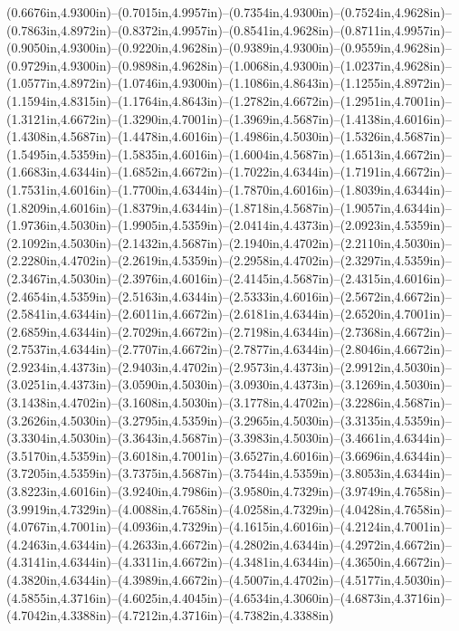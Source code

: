(0.6676in,4.9300in)--(0.7015in,4.9957in)--(0.7354in,4.9300in)--(0.7524in,4.9628in)--(0.7863in,4.8972in)--(0.8372in,4.9957in)--(0.8541in,4.9628in)--(0.8711in,4.9957in)--(0.9050in,4.9300in)--(0.9220in,4.9628in)--(0.9389in,4.9300in)--(0.9559in,4.9628in)--(0.9729in,4.9300in)--(0.9898in,4.9628in)--(1.0068in,4.9300in)--(1.0237in,4.9628in)--(1.0577in,4.8972in)--(1.0746in,4.9300in)--(1.1086in,4.8643in)--(1.1255in,4.8972in)--(1.1594in,4.8315in)--(1.1764in,4.8643in)--(1.2782in,4.6672in)--(1.2951in,4.7001in)--(1.3121in,4.6672in)--(1.3290in,4.7001in)--(1.3969in,4.5687in)--(1.4138in,4.6016in)--(1.4308in,4.5687in)--(1.4478in,4.6016in)--(1.4986in,4.5030in)--(1.5326in,4.5687in)--(1.5495in,4.5359in)--(1.5835in,4.6016in)--(1.6004in,4.5687in)--(1.6513in,4.6672in)--(1.6683in,4.6344in)--(1.6852in,4.6672in)--(1.7022in,4.6344in)--(1.7191in,4.6672in)--(1.7531in,4.6016in)--(1.7700in,4.6344in)--(1.7870in,4.6016in)--(1.8039in,4.6344in)--(1.8209in,4.6016in)--(1.8379in,4.6344in)--(1.8718in,4.5687in)--(1.9057in,4.6344in)--(1.9736in,4.5030in)--(1.9905in,4.5359in)--(2.0414in,4.4373in)--(2.0923in,4.5359in)--(2.1092in,4.5030in)--(2.1432in,4.5687in)--(2.1940in,4.4702in)--(2.2110in,4.5030in)--(2.2280in,4.4702in)--(2.2619in,4.5359in)--(2.2958in,4.4702in)--(2.3297in,4.5359in)--(2.3467in,4.5030in)--(2.3976in,4.6016in)--(2.4145in,4.5687in)--(2.4315in,4.6016in)--(2.4654in,4.5359in)--(2.5163in,4.6344in)--(2.5333in,4.6016in)--(2.5672in,4.6672in)--(2.5841in,4.6344in)--(2.6011in,4.6672in)--(2.6181in,4.6344in)--(2.6520in,4.7001in)--(2.6859in,4.6344in)--(2.7029in,4.6672in)--(2.7198in,4.6344in)--(2.7368in,4.6672in)--(2.7537in,4.6344in)--(2.7707in,4.6672in)--(2.7877in,4.6344in)--(2.8046in,4.6672in)--(2.9234in,4.4373in)--(2.9403in,4.4702in)--(2.9573in,4.4373in)--(2.9912in,4.5030in)--(3.0251in,4.4373in)--(3.0590in,4.5030in)--(3.0930in,4.4373in)--(3.1269in,4.5030in)--(3.1438in,4.4702in)--(3.1608in,4.5030in)--(3.1778in,4.4702in)--(3.2286in,4.5687in)--(3.2626in,4.5030in)--(3.2795in,4.5359in)--(3.2965in,4.5030in)--(3.3135in,4.5359in)--(3.3304in,4.5030in)--(3.3643in,4.5687in)--(3.3983in,4.5030in)--(3.4661in,4.6344in)--(3.5170in,4.5359in)--(3.6018in,4.7001in)--(3.6527in,4.6016in)--(3.6696in,4.6344in)--(3.7205in,4.5359in)--(3.7375in,4.5687in)--(3.7544in,4.5359in)--(3.8053in,4.6344in)--(3.8223in,4.6016in)--(3.9240in,4.7986in)--(3.9580in,4.7329in)--(3.9749in,4.7658in)--(3.9919in,4.7329in)--(4.0088in,4.7658in)--(4.0258in,4.7329in)--(4.0428in,4.7658in)--(4.0767in,4.7001in)--(4.0936in,4.7329in)--(4.1615in,4.6016in)--(4.2124in,4.7001in)--(4.2463in,4.6344in)--(4.2633in,4.6672in)--(4.2802in,4.6344in)--(4.2972in,4.6672in)--(4.3141in,4.6344in)--(4.3311in,4.6672in)--(4.3481in,4.6344in)--(4.3650in,4.6672in)--(4.3820in,4.6344in)--(4.3989in,4.6672in)--(4.5007in,4.4702in)--(4.5177in,4.5030in)--(4.5855in,4.3716in)--(4.6025in,4.4045in)--(4.6534in,4.3060in)--(4.6873in,4.3716in)--(4.7042in,4.3388in)--(4.7212in,4.3716in)--(4.7382in,4.3388in) 